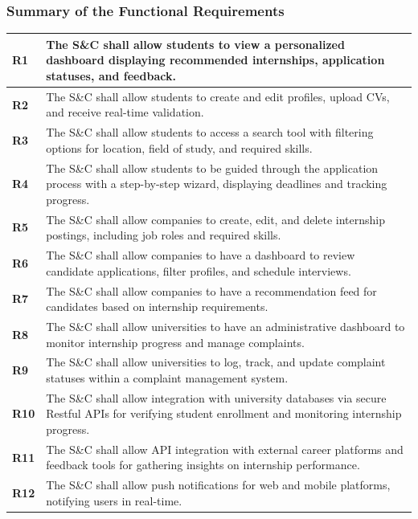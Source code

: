 \subsubsection{Summary of the Functional Requirements}
\begin{longtable}{|p{}|p{}|}
\hline
\textbf{R1} & The S\&C shall allow students to view a personalized dashboard displaying recommended internships, application statuses, and feedback. \\ 
\hline
\textbf{R2} & The S\&C shall allow students to create and edit profiles, upload CVs, and receive real-time validation. \\ 
\hline
\textbf{R3} & The S\&C shall allow students to access a search tool with filtering options for location, field of study, and required skills. \\ 
\hline
\textbf{R4} & The S\&C shall allow students to be guided through the application process with a step-by-step wizard, displaying deadlines and tracking progress. \\ 
\hline
\textbf{R5} & The S\&C shall allow companies to create, edit, and delete internship postings, including job roles and required skills. \\ 
\hline
\textbf{R6} & The S\&C shall allow companies to have a dashboard to review candidate applications, filter profiles, and schedule interviews. \\ 
\hline
\textbf{R7} & The S\&C shall allow companies to have a recommendation feed for candidates based on internship requirements. \\ 
\hline
\textbf{R8} & The S\&C shall allow universities to have an administrative dashboard to monitor internship progress and manage complaints. \\ 
\hline
\textbf{R9} & The S\&C shall allow universities to log, track, and update complaint statuses within a complaint management system. \\ 
\hline
\textbf{R10} & The S\&C shall allow integration with university databases via secure Restful APIs for verifying student enrollment and monitoring internship progress. \\ 
\hline
\textbf{R11} & The S\&C shall allow API integration with external career platforms and feedback tools for gathering insights on internship performance. \\ 
\hline
\textbf{R12} & The S\&C shall allow push notifications for web and mobile platforms, notifying users in real-time. \\ 
\hline

\end{longtable}
